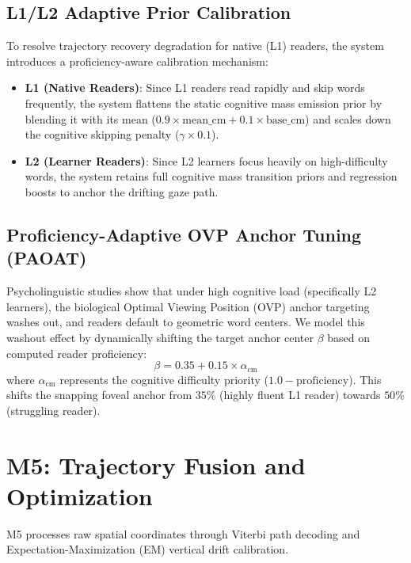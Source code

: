 \documentclass[sigconf]{acmart}
\begin{document}
\subsection{L1/L2 Adaptive Prior Calibration}
To resolve trajectory recovery degradation for native (L1) readers, the system introduces a proficiency-aware calibration mechanism:
\begin{itemize}
    \item \textbf{L1 (Native Readers)}: Since L1 readers read rapidly and skip words frequently, the system flattens the static cognitive mass emission prior by blending it with its mean ($0.9 \times \text{mean\_cm} + 0.1 \times \text{base\_cm}$) and scales down the cognitive skipping penalty ($\gamma \times 0.1$).
    \item \textbf{L2 (Learner Readers)}: Since L2 learners focus heavily on high-difficulty words, the system retains full cognitive mass transition priors and regression boosts to anchor the drifting gaze path.
\end{itemize}

\subsection{Proficiency-Adaptive OVP Anchor Tuning (PAOAT)}
Psycholinguistic studies show that under high cognitive load (specifically L2 learners), the biological Optimal Viewing Position (OVP) anchor targeting washes out, and readers default to geometric word centers. We model this washout effect by dynamically shifting the target anchor center $\beta$ based on computed reader proficiency:
\begin{equation}
\beta = 0.35 + 0.15 \times \alpha_{\text{cm}}
\end{equation}
where $\alpha_{\text{cm}}$ represents the cognitive difficulty priority ($1.0 - \text{proficiency}$). This shifts the snapping foveal anchor from $35\%$ (highly fluent L1 reader) towards $50\%$ (struggling reader).

\section{M5: Trajectory Fusion and Optimization}
M5 processes raw spatial coordinates through Viterbi path decoding and Expectation-Maximization (EM) vertical drift calibration.
\end{document}
